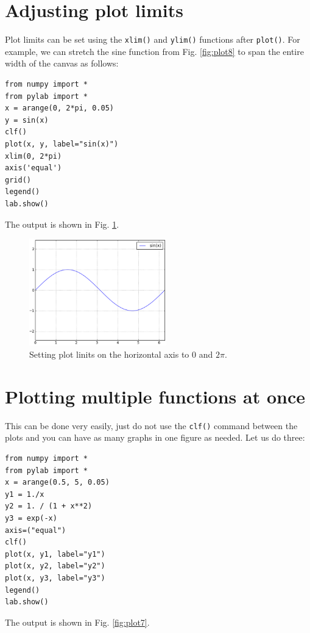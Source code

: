 \documentclass{article}
\begin{document}
\section{Adjusting plot limits}

Plot limits can be set using the {\tt xlim()} and {\tt ylim()}
functions after {\tt plot()}. For example, we can stretch the sine
function from Fig. \ref{fig:plot8} to span the entire width of the 
canvas as follows:

\begin{verbatim}
from numpy import *
from pylab import *
x = arange(0, 2*pi, 0.05)
y = sin(x)
clf()
plot(x, y, label="sin(x)")
xlim(0, 2*pi)
axis('equal')
grid()
legend()
lab.show()
\end{verbatim}
\noindent
The output is shown in Fig. \ref{fig:plot9}.

\begin{figure}[!ht]
\begin{center}
\includegraphics[width=0.53\textwidth]{img/plot9.png}
\end{center}
\vspace{-4mm}
\caption{Setting plot linits on the horizontal axis to $0$ and $2\pi$.}
\label{fig:plot9}
\vspace{-2mm}
\end{figure}
\noindent


\section{Plotting multiple functions at once}

This can be done very easily, just do not use the {\tt clf()}
command between the plots and you can have as many graphs 
in one figure as needed. Let us do three:

\begin{verbatim}
from numpy import *
from pylab import *
x = arange(0.5, 5, 0.05)
y1 = 1./x
y2 = 1. / (1 + x**2)
y3 = exp(-x)
axis=("equal")
clf()
plot(x, y1, label="y1")
plot(x, y2, label="y2")
plot(x, y3, label="y3")
legend()
lab.show()
\end{verbatim}
\noindent
The output is shown in Fig. \ref{fig:plot7}.
\newpage
\end{document}
